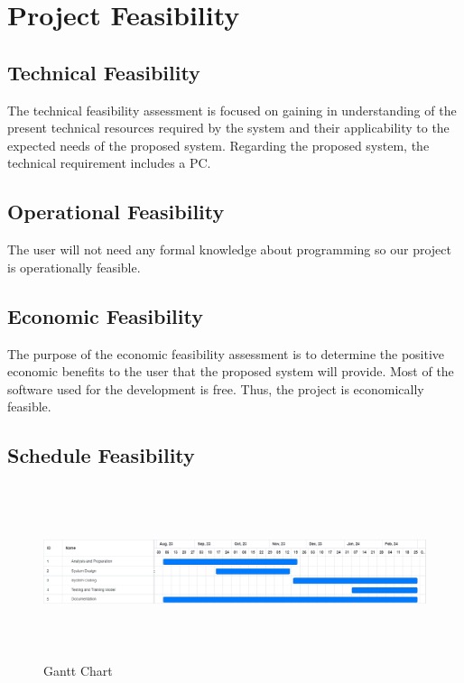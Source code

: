 \section{Project Feasibility}
\vspace{-18pt}
\subsection{Technical Feasibility}
\vspace{-18pt}
The technical feasibility assessment is focused on gaining in understanding of the present technical resources required by the system and their applicability to the expected needs of the proposed system. Regarding the proposed system, the technical requirement includes a PC.
\vspace{-18pt}
\subsection{Operational Feasibility}
\vspace{-18pt}
The user will not need any formal knowledge about programming so our project is operationally feasible.
\vspace{-18pt}
\subsection{Economic Feasibility}
\vspace{-18pt}
The purpose of the economic feasibility assessment is to determine the positive economic benefits to the user that the proposed system will provide. Most of the software used for the development is free. Thus, the project is economically feasible.
\vspace{-18pt}
\subsection{Schedule Feasibility}
\begin{figure}[!h] %
\begin{center}
	\includegraphics[width=6in,height=2in
	]{images/gantt26.png} 
	\caption{Gantt Chart} %
	\label{figGanttChart} %
\end{center}
\end{figure}
